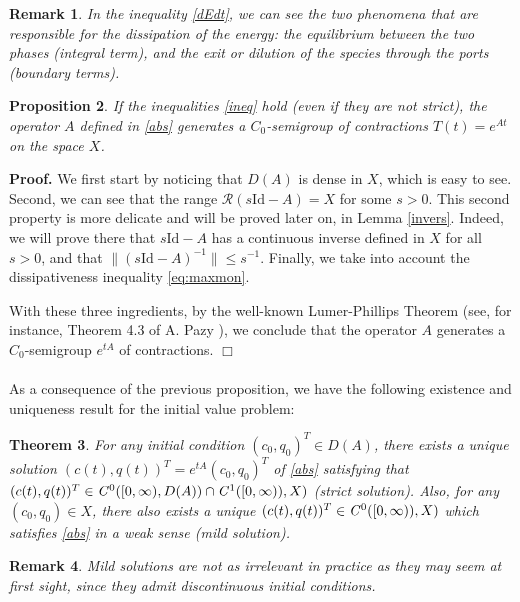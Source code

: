 \documentclass[a4paper]{article}
\newtheorem{thm}{Theorem}[section]
\newtheorem{prop}[thm]{Proposition}
\newtheorem{rem}[thm]{Remark}
\def\cC{{\cal{C}}}
\def\cC{{\it{C}}}
\def\Id{\rm{Id}}
\def\Id{\mathrm{Id}}
\numberwithin{equation}{section}
\newenvironment{pf}{\vspace{0.5em}\noindent\textbf{Proof.} }{\quad \hfill $\Box$ \\ \vspace{0.2em}\\}
\begin{document}
\begin{rem}\label{rem:dissipE}
In the inequality \eqref{dEdt}, we can see the two phenomena that are responsible for the dissipation of the energy: the equilibrium between the two phases (integral term), and the exit or dilution of the species through the ports (boundary terms).
\end{rem}
\begin{prop}%
If the inequalities \eqref{ineq} hold (even if they are not strict), the operator $A$ defined in \eqref{abs} generates a $C_0$-semigroup of contractions $T(t)=e^{At}$ on the space $X$.
\end{prop}
\begin{pf}
We first start by noticing that $D(A)$ is dense in $X$, which is easy to see. Second, we can see that the range $\mathcal{R}(s\Id-A)=X$ for some $s>0$. This second property is more delicate and will be proved later on, in Lemma \ref{invers}. Indeed, we will prove there that $s\Id-A$ has a continuous inverse defined in $X$ for all $s>0$, and that $\|(s\Id-A)^{-1}\|\le s^{-1}$. Finally, we take into account the dissipativeness inequality \eqref{eq:maxmon}.

With these three ingredients, by the well-known Lumer-Phillips Theorem (see, for instance, Theorem 4.3 of A. Pazy \cite{Pazy}), we conclude that the operator $A$ generates a $C_0$-semigroup $e^{tA}$ of contractions.
\end{pf}
As a consequence of the previous proposition, we have the following existence and uniqueness result for the initial value problem:
\begin{thm}%
For any initial condition $(c_0,q_0)^T\in D(A)$, there exists a unique solution $(c(t),q(t))^T=e^{tA}(c_0,q_0)^T$ of \eqref{abs} satisfying that $(c(t),q(t))^T\in \cC^0([0,\infty),D(A))\cap\cC^1([0,\infty)),X)$ (\textsl{strict solution}). Also, for any $(c_0,q_0)\in X$, there also exists a unique $(c(t),q(t))^T\in\cC^0([0,\infty)),X)$ which satisfies \eqref{abs} in a weak sense (\textsl{mild solution}).
\end{thm}
\begin{rem}
Mild solutions are not as irrelevant in practice as they may seem at first sight, since they admit discontinuous initial conditions.
\end{rem}
\end{document}

